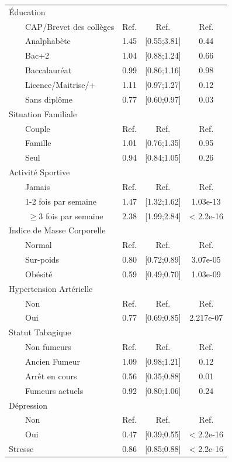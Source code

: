 \documentclass{book}
\begin{document}
\begin{longtable}{lccc}
 
Éducation&&&\\
$\qquad$CAP/Brevet des collèges &Ref.&Ref.&Ref.\\
$\qquad$Analphabète &1.45& [0.55;3.81] & 0.44 \\   
$\qquad$Bac+2       &1.04 & [0.88;1.24] & 0.66   \\  
$\qquad$Baccalauréat   &0.99& [0.86;1.16] & 0.98   \\        
$\qquad$Licence/Maitrise/+   &1.11 & [0.97;1.27] & 0.12 \\   
$\qquad$Sans diplôme   &0.77 & [0.60;0.97] & 0.03\\

         
Situation Familiale&&&\\
$\qquad$Couple&Ref.&Ref.&Ref.\\
$\qquad$Famille&1.01& [0.76;1.35]& 0.95\\    
$\qquad$Seul&0.94 & [0.84;1.05]& 0.26   \\

Activité Sportive&&&\\
$\qquad$Jamais & Ref.&Ref.&Ref.\\
$\qquad$1-2 fois par semaine&1.47& [1.32;1.62]& 1.03e-13\\
$\qquad$ $\geq$3 fois par semaine &2.38 &[1.99;2.84] &< 2.2e-16\\
                  

Indice de Masse Corporelle&&&\\
$\qquad$Normal &Ref.&Ref.&Ref.\\
$\qquad$Sur-poids &0.80 &[0.72;0.89]& 3.07e-05\\ 
$\qquad$Obésité&0.59& [0.49;0.70]& 1.03e-09\\ 

Hypertension Artérielle&&&\\
$\qquad$Non& Ref.&Ref.&Ref.\\
$\qquad$Oui &0.77 &[0.69;0.85]& 2.217e-07\\ 

Statut Tabagique&&&\\
$\qquad$Non fumeurs &Ref.&Ref.&Ref.\\
$\qquad$Ancien Fumeur &1.09& [0.98;1.21]& 0.12\\    
$\qquad$Arrêt en cours &0.56 &[0.35;0.88]& 0.01\\ 
$\qquad$Fumeurs actuels &0.92& [0.80;1.06]& 0.24\\

Dépression&&&\\
$\qquad$Non&Ref.&Ref.&Ref.\\
$\qquad$Oui & 0.47 &[0.39;0.55]& < 2.2e-16\\
Stresse &0.86& [0.85;0.88]& < 2.2e-16\\ 
\hline
\end{longtable}
\end{document}
